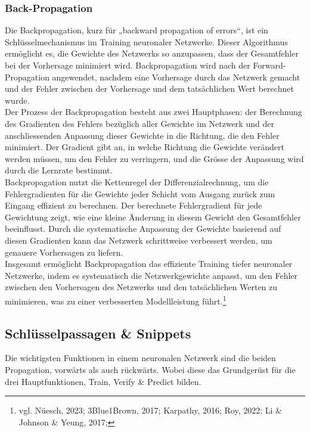 \subsubsection{Back-Propagation}
\label{sec:RealBackPropagation}
Die Backpropagation, kurz für „backward propagation of errors“, ist ein Schlüsselmechanismus im Training neuronaler Netzwerke. Dieser Algorithmus ermöglicht es, die Gewichte des Netzwerks so anzupassen, dass der Gesamtfehler bei der Vorhersage minimiert wird. Backpropagation wird nach der Forward-Propagation angewendet, nachdem eine Vorhersage durch das Netzwerk gemacht und der Fehler zwischen der Vorhersage und dem tatsächlichen Wert berechnet wurde.
\\
Der Prozess der Backpropagation besteht aus zwei Hauptphasen: der Berechnung des Gradienten des Fehlers bezüglich aller Gewichte im Netzwerk und der anschliessenden Anpassung dieser Gewichte in die Richtung, die den Fehler minimiert. Der Gradient gibt an, in welche Richtung die Gewichte verändert werden müssen, um den Fehler zu verringern, und die Grösse der Anpassung wird durch die Lernrate bestimmt.
\\
Backpropagation nutzt die Kettenregel der Differenzialrechnung, um die Fehlergradienten für die Gewichte jeder Schicht vom Ausgang zurück zum Eingang effizient zu berechnen. Der berechnete Fehlergradient für jede Gewichtung zeigt, wie eine kleine Änderung in diesem Gewicht den Gesamtfehler beeinflusst. Durch die systematische Anpassung der Gewichte basierend auf diesen Gradienten kann das Netzwerk schrittweise verbessert werden, um genauere Vorhersagen zu liefern.
\\
Insgesamt ermöglicht Backpropagation das effiziente Training tiefer neuronaler Netzwerke, indem es systematisch die Netzwerkgewichte anpasst, um den Fehler zwischen den Vorhersagen des Netzwerks und den tatsächlichen Werten zu minimieren, was zu einer verbesserten Modellleistung führt.\footnote{vgl. Nüesch, 2023; 3Blue1Brown, 2017; Karpathy, 2016; Roy, 2022; Li \& Johnson \& Yeung, 2017; }


\subsection{Schlüsselpassagen \& Snippets}
\label{sec:RealSnippetsCode}
Die wichtigsten Funktionen in einem neuronalen Netzwerk sind die beiden Propagation, vorwärts als auch rückwärts. Wobei diese das Grundgerüst für die drei Hauptfunktionen, Train, Verify \& Predict bilden.

